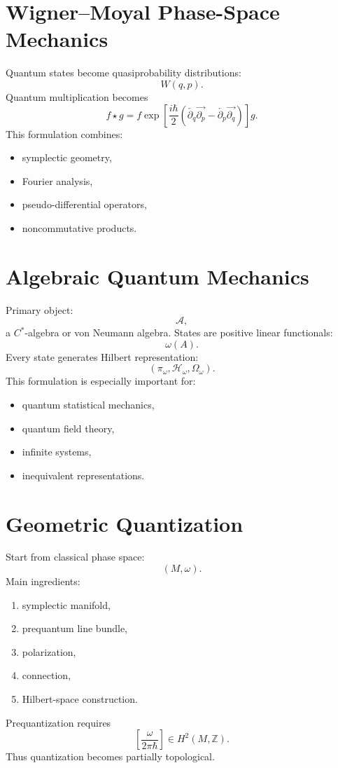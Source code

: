 \section{Wigner--Moyal Phase-Space Mechanics}
\label{qmf:wm}
Quantum states become quasiprobability distributions:
\[W(q,p).\]
Quantum multiplication becomes
\[f \star g=f\exp\left[\frac{i\hbar}{2}
\left(
\overleftarrow{\partial_q}
\overrightarrow{\partial_p}-
\overleftarrow{\partial_p}
\overrightarrow{\partial_q}
\right)\right]g.\]
This formulation combines:
\begin{itemize}
\item symplectic geometry,
\item Fourier analysis,
\item pseudo-differential operators,
\item noncommutative products.
\end{itemize}

\section{Algebraic Quantum Mechanics}
\label{qmf:aqm}
Primary object:
\[\mathcal A,\]
a $C^*$-algebra or von Neumann algebra.
States are positive linear functionals:
\[\omega(A).\]
Every state generates Hilbert representation:
\[(\pi_\omega,\mathcal H_\omega,\Omega_\omega).\]
This formulation is especially important for:
\begin{itemize}
\item quantum statistical mechanics,
\item quantum field theory,
\item infinite systems,
\item inequivalent representations.
\end{itemize}

\section{Geometric Quantization}
\label{qmf:gq}
Start from classical phase space:
\[(M,\omega).\]
Main ingredients:
\begin{enumerate}
\item symplectic manifold,
\item prequantum line bundle,
\item polarization,
\item connection,
\item Hilbert-space construction.
\end{enumerate}
Prequantization requires
\[\left[\frac{\omega}{2\pi\hbar}\right]\in H^2(M,\mathbb Z).\]
Thus quantization becomes partially topological.

